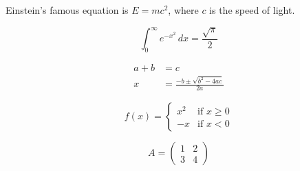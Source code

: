 \documentclass{article}
\begin{document}
Einstein's famous equation is $E = mc^2$, where $c$ is the speed of light.

\[
  \int_0^\infty e^{-x^2}\,dx = \frac{\sqrt{\pi}}{2}
\]

\begin{align*}
  a + b &= c \\
  x     &= \frac{-b \pm \sqrt{b^2 - 4ac}}{2a}
\end{align*}

\[
  f(x) = \begin{cases}
    x^2 & \text{if } x \ge 0 \\
    -x  & \text{if } x < 0
  \end{cases}
\]

\[
  A = \begin{pmatrix} 1 & 2 \\ 3 & 4 \end{pmatrix}
\]
\end{document}
